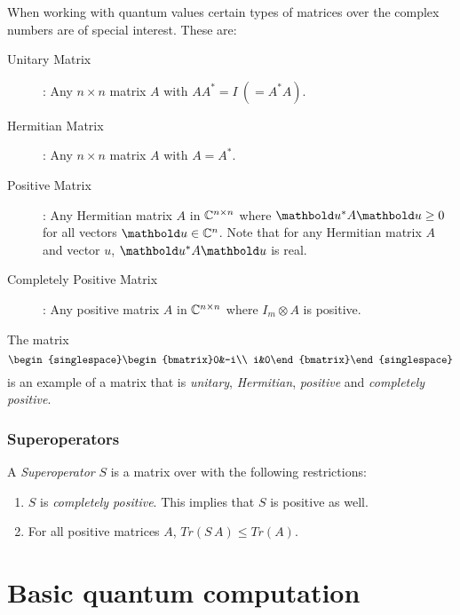 When working with quantum values certain types of matrices over the
complex numbers are of special interest.
These are:
\begin{description}
\item[Unitary Matrix]: Any $n \times n$
matrix $A$ with $A A^{*} = I\ (= A^{*} A)$.
\item[Hermitian Matrix]: Any  $n \times n$ matrix $A$ with $A=A^{*}$.
\item[Positive Matrix]: Any Hermitian matrix $A$ in
$\mathbb{C}^{n\times n}$
where $\vc{u}^{*} A \vc{u} \ge 0$ for all vectors
$\vc{u}\in \complex^n$. Note
that for any Hermitian matrix $A$ and vector $u$,
$\vc{u}^{*} A \vc{u}$ is real.
\item[Completely Positive Matrix]: Any positive matrix $A$ in
$\mathbb{C}^{n\times n}$
where $I_m \otimes A$ is positive.
\end{description}
The matrix
\[{\begin{singlespace}\begin{bmatrix}0&-i\\
i&0\end{bmatrix}\end{singlespace}}\]
is an example of a matrix that is \emph{unitary}, \emph{Hermitian},
\emph{positive} and \emph{completely positive}.



\subsubsection{Superoperators} %
\label{ssub:superoperators}


A \emph{Superoperator} $S$ is a matrix over \complex{}
with the following restrictions:
\begin{enumerate}
\item{} $S$ is \emph{completely positive}. This implies that
$S$ is positive as well.
\item{} For all positive matrices $A$, $Tr(S\,A) \leq Tr(A)$.
\end{enumerate}




\section{Basic quantum computation} %
\label{sec:basic_quantum_computation}

